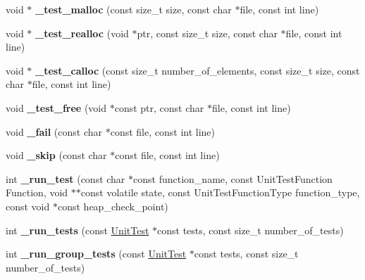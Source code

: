 \begin{DoxyCompactItemize}
void $\ast$ {\bfseries \+\_\+test\+\_\+malloc} (const size\+\_\+t size, const char $\ast$file, const int line)
\item 
\mbox{\label{group__cmocka_gaa329fa627c139f67e6a78ee3840baaac}} 
void $\ast$ {\bfseries \+\_\+test\+\_\+realloc} (void $\ast$ptr, const size\+\_\+t size, const char $\ast$file, const int line)
\item 
\mbox{\label{group__cmocka_ga5b3c9fe0e921b4cc436894b002e64b78}} 
void $\ast$ {\bfseries \+\_\+test\+\_\+calloc} (const size\+\_\+t number\+\_\+of\+\_\+elements, const size\+\_\+t size, const char $\ast$file, const int line)
\item 
\mbox{\label{group__cmocka_gaa638dca2eb88eb45ba9b3dc810701345}} 
void {\bfseries \+\_\+test\+\_\+free} (void $\ast$const ptr, const char $\ast$file, const int line)
\item 
\mbox{\label{group__cmocka_ga200fb175325dc307bc094dcacd6291c1}} 
void {\bfseries \+\_\+fail} (const char $\ast$const file, const int line)
\item 
\mbox{\label{group__cmocka_gab102a4c6a13c149968999815285300f3}} 
void {\bfseries \+\_\+skip} (const char $\ast$const file, const int line)
\item 
\mbox{\label{group__cmocka_ga20702ca5c3414c1c2bf98c3b73f90a21}} 
int {\bfseries \+\_\+run\+\_\+test} (const char $\ast$const function\+\_\+name, const Unit\+Test\+Function Function, void $\ast$$\ast$const volatile state, const Unit\+Test\+Function\+Type function\+\_\+type, const void $\ast$const heap\+\_\+check\+\_\+point)
\item 
\mbox{\label{group__cmocka_ga7c8bb9469b03f09534a3c259e43e584b}} 
int {\bfseries \+\_\+run\+\_\+tests} (const \hyperlink{structUnitTest}{Unit\+Test} $\ast$const tests, const size\+\_\+t number\+\_\+of\+\_\+tests)
\item 
\mbox{\label{group__cmocka_ga79582ce4c305dfbfefe8fb8b0da40dc9}} 
int {\bfseries \+\_\+run\+\_\+group\+\_\+tests} (const \hyperlink{structUnitTest}{Unit\+Test} $\ast$const tests, const size\+\_\+t number\+\_\+of\+\_\+tests)
$$
\end{DoxyCompactItemize}
